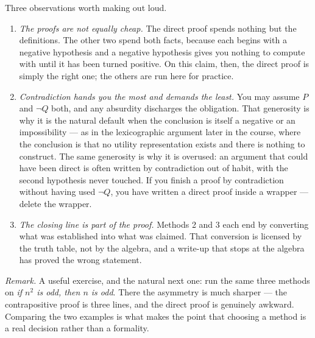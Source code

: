 \documentclass[12pt]{article}
\newenvironment{remark}
  {\par\medskip\noindent\textit{Remark.}\enspace}
  {\par\medskip}
\begin{document}
\noindent
Three observations worth making out loud.

\begin{enumerate}[label=(\arabic*),leftmargin=2.4em,topsep=.4em,itemsep=.5em]
  \item \emph{The proofs are not equally cheap.} The direct proof spends
        nothing but the definitions. The other two spend both facts, because
        each begins with a negative hypothesis and a negative hypothesis gives
        you nothing to compute with until it has been turned positive. On this
        claim, then, the direct proof is simply the right one; the others are
        run here for practice.

  \item \emph{Contradiction hands you the most and demands the least.} You may
        assume $P$ and $\lnot Q$ both, and any absurdity discharges the
        obligation. That generosity is why it is the natural default when the
        conclusion is itself a negative or an impossibility --- as in the
        lexicographic argument later in the course, where the conclusion is that
        no utility representation exists and there is nothing to construct.
        The same generosity is why it is overused: an argument that could have
        been direct is often written by contradiction out of habit, with the
        second hypothesis never touched. If you finish a proof by contradiction
        without having used $\lnot Q$, you have written a direct proof inside a
        wrapper --- delete the wrapper.

  \item \emph{The closing line is part of the proof.} Methods 2 and 3 each end
        by converting what was established into what was claimed. That
        conversion is licensed by the truth table, not by the algebra, and a
        write-up that stops at the algebra has proved the wrong statement.
\end{enumerate}

\begin{remark}
A useful exercise, and the natural next one: run the same three methods on
\emph{if $n^{2}$ is odd, then $n$ is odd}. There the asymmetry is much sharper
--- the contrapositive proof is three lines, and the direct proof is genuinely
awkward. Comparing the two examples is what makes the point that choosing a
method is a real decision rather than a formality.
\end{remark}
\end{document}
